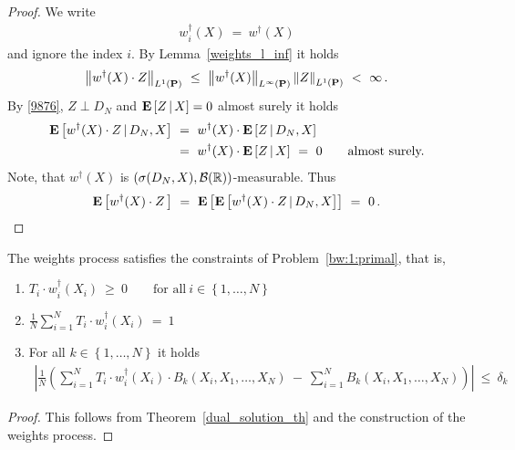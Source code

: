 \begin{proof}
  We write
  \begin{gather*}
    w_i^\dagger(X)
  \ 
  =
  \ 
  w^\dagger(X)
  \end{gather*}
  and ignore the index $i$.
  By Lemma~\ref{weights_l_inf} it holds
  \begin{gather}
    \label{9876}
    \norm{
  w^\dagger(X)\cdot Z
    }_{L^1(\P)}
    \ 
  \le
    \ 
  \norm{w^\dagger(X)}_{L^\infty(\P)}
  \norm{Z}_{L^1(\P)}
  \ 
  <
  \ 
  \infty
  \,.
  \end{gather}
  By 
  \eqref{9876},
  $Z\perp D_N$
  and
  $
\mathbf{E}
\left[
  Z
  \,
  |
  \, 
  X
\right]
= 0
  $
  almost surely
  it holds 
  \begin{align*}
    \E
  \left[
  w^\dagger(X)
  \cdot
  Z
  \,
  |
  \,
  D_N,X
  \right]
  &
  \ 
  =
  \ 
  w^\dagger(X)
  \cdot
  \E
  \left[
  Z
  \,
  |
  \,
  D_N,X
  \right]
  \\
  &
  \ 
  =
  \ 
  w^\dagger(X)
  \cdot
  \E
  \left[
  Z
  \,
  |
  \,
  X
  \right]
  \
  =
  \ 
  0
  \qquad
  \text{almost surely.}
  \end{align*}
  Note, that $w^\dagger(X)$ is 
  $
  \left(
  \sigma(D_N,X),\mathcal{B}(\mathbb{R})
  \right)
  $-measurable.  
  Thus
  \begin{gather*}
    \E
    \left[
  w^\dagger(X)
  \cdot
  Z
  \,
    \right]
    \ 
    =
    \ 
    \E
    \left[
 \E
  \left[
  w^\dagger(X)
  \cdot
  Z
  \,
  |
  \,
  D_N,X
  \right]
    \right]
    \ 
    =
    \ 
    0
    \,.
     \end{gather*}
\end{proof}

\begin{theorem}
  The weights process satisfies the constraints
  of Problem~\ref{bw:1:primal}, that is,
  \begin{enumerate}[label=(\roman*)]
    \item
      $
      T_i\cdot w_i^\dagger(X_i)
      \ 
      \ge
      \ 
      0
      \qquad
      \text{for all}\ 
      i\in  \left\{ 1,\ldots,N \right\}
      $
    \item
      $
      \frac{1}{N}
      \sum_{i=1}^{N} 
      T_i\cdot w_i^\dagger(X_i)
      \ 
      =
      \ 
      1
      $
    \item
      For all $k\in \left\{ 1,\ldots,N \right\}$
      it holds
      \begin{align*}
      \left| 
      \frac{1}{N}
      \left( 
        \sum_{i=1}^{N} 
      T_i\cdot w_i^\dagger(X_i)
      \cdot
        B_k(X_i,X_1,\ldots,X_N)
        \
        -
        \
        \sum_{i=1}^{N} 
        B_k(X_i,X_1,\ldots,X_N)
      \right)
      \right|
      \ 
      \le
      \ 
      \delta_k
      \end{align*}
  \end{enumerate}
\end{theorem}
\begin{proof}
  This follows from Theorem~\ref{dual_solution_th}
  and the construction of the weights process.
\end{proof}
